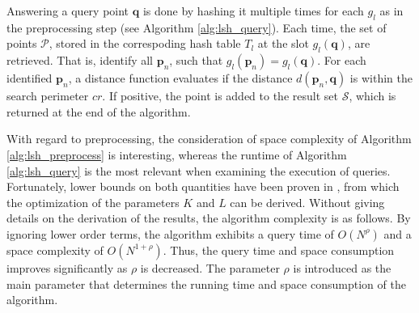 \documentclass[../../../main.tex]{subfiles}
\begin{document}
 Answering a query point $\bm{q}$ is done by hashing it multiple times for each $g_l$ as in the preprocessing step (see Algorithm \ref{alg:lsh_query}). Each time, the set of points $\mathcal{P}$, stored in the correspoding hash table $T_l$ at the slot $g_l(\bm{q})$, are retrieved. That is, identify all $\bm{p}_n$, such that $g_l(\bm{p}_n) = g_l(\bm{q})$. For each identified $\bm{p}_n$, a distance function evaluates if the distance $d(\bm{p}_n, \bm{q})$ is within the search perimeter $cr$. If positive, the point is added to the result set $\mathcal{S}$, which is returned at the end of the algorithm.

 With regard to preprocessing, the consideration of space complexity of Algorithm \ref{alg:lsh_preprocess} is interesting, whereas the runtime of Algorithm \ref{alg:lsh_query} is the most relevant when examining the execution of queries. Fortunately, lower bounds on both quantities have been proven in \cite{motwani2006lower}, from which the optimization of the parameters $K$ and $L$ can be derived. Without giving details on the derivation of the results, the algorithm complexity is as follows. By ignoring lower order terms, the algorithm exhibits a query time of $O(N^\rho)$ and a space complexity of $O(N^{1+\rho})$. Thus, the query time and space consumption improves significantly as $\rho$ is decreased. The parameter $\rho$ is introduced as the main parameter that determines the running time and space consumption of the algorithm.
\end{document}

